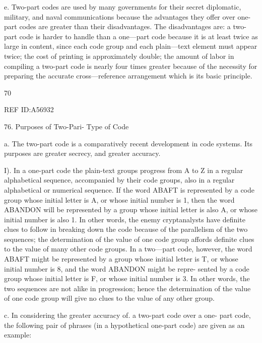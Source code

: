 e. Two-part codes are used by many governments for their secret
diplomatic, military, and naval communications because the advantages
they offer over one-part codes are greater than their disadvantages. The
disadvantages are: a two-part code is harder to handle than a one—part
code because it is at least twice as large in content, since each code group
and each plain—text element must appear twice; the cost of printing is
approximately double; the amount of labor in compiling a two-part code
is nearly four times greater because of the necessity for preparing the
accurate cross—reference arrangement which is its basic principle.

70

 

 

 

 

 

 

 

 

REF ID:A56932

76. Purposes of Two-Pari- Type of Code

a. The two-part code is a comparatively recent development in code
systems. Its purposes are greater secrecy, and greater accuracy.

I). In a one-part code the plain-text groups progress from A to Z in a
regular alphabetical sequence, accompanied by their code groups, also in
a regular alphabetical or numerical sequence. If the word ABAFT is
represented by a code group whose initial letter is A, or whose initial
number is 1, then the word ABANDON will be represented by a group
whose initial letter is also A, or whose initial number is also 1. In other
words, the enemy cryptanalysts have deﬁnite clues to follow in breaking
down the code because of the parallelism of the two sequences; the
determination of the value of one code group affords deﬁnite clues to the
value of many other code groups. In a two—part code, however, the word
ABAFT might be represented by a group whose initial letter is T, or
whose initial number is 8, and the word ABANDON might be repre-
sented by a code group whose initial letter is F, or whose initial number
is 3. In other words, the two sequences are not alike in progression;
hence the determination of the value of one code group will give no clues
to the value of any other group.

c. In considering the greater accuracy of. a two-part code over a one-
part code, the following pair of phrases (in a hypothetical one-part code)
are given as an example:

